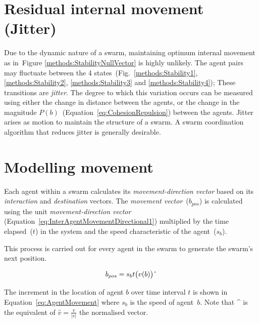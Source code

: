 \documentclass{ieeeaccess}
\begin{document}

\section{Residual internal movement (Jitter)}\label{Section:Jitter}
Due to the dynamic nature of a swarm, maintaining optimum internal movement as in~Figure \ref{methods:StabilityNullVector} is highly unlikely. The agent pairs may fluctuate between the 4 states~(Fig.~\ref{methods:Stability1}, \ref{methods:Stability2}, \ref{methods:Stability3} and \ref{methods:Stability4}); These transitions are \textit{jitter}. The degree to which this variation occurs can be measured using either the change in distance between the agents, or the change in the magnitude $P(b)$~(Equation~\ref{eq:CohesionRepulsion}) between the agents. Jitter arises as motion to maintain the structure of a swarm. A swarm coordination algorithm that reduces jitter is generally desirable.

\section{Modelling movement}\label{Section::Movement1}
Each agent within a swarm calculates its \textit{movement-direction vector} based on its \textit{interaction} and \textit{destination} vectors. The \textit{movement vector}~($b_{pos}$) is calculated using the unit \textit{movement-direction vector} (Equation~\ref{eq:InterAgentMovementDirectional1}) multiplied by the time elapsed~($t$) in the system and the speed characteristic of the agent~($s_b$).

This process is carried out for every agent in the swarm to generate the swarm's next position.

\begin{center}
\begin{equation}
\label{eq:AgentMovement}
b_{pos}=s_{b}t\big(v(b)\big)\string^ 
\end{equation}
\end{center}

The increment in the location of agent $b$ over time interval $t$ is shown in Equation~\ref{eq:AgentMovement} where $s_b$ is the speed of agent~$b$. Note that \string^ is the equivalent of $\hat{v} = \frac{v}{|v|}$ the normalised vector.
\end{document}
